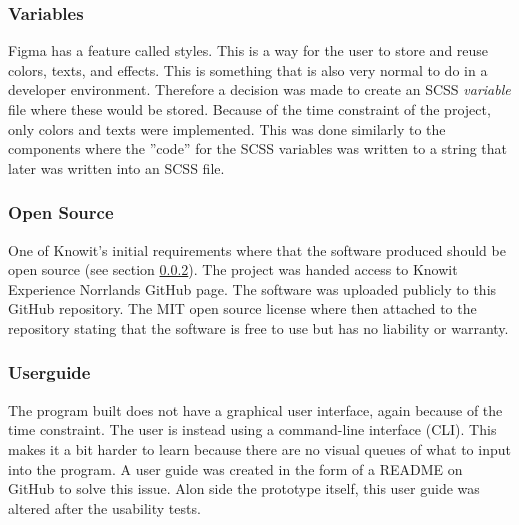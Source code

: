 \subsubsection{Variables}%
\label{ssub:Variables}
Figma has a feature called styles. This is a way for the user to store and reuse colors, texts, and effects. This is something that is also very normal to do in a developer environment. Therefore a decision was made to create an SCSS \textit{variable} file where these would be stored. Because of the time constraint of the project, only colors and texts were implemented. This was done similarly to the components where the ''code'' for the SCSS variables was written to a string that later was written into an SCSS file. 


\subsubsection{Open Source}%
\label{ssub:Open Source}
One of Knowit's initial requirements where that the software produced should be open source (see section \ref{ssub:Open Source}). The project was handed access to Knowit Experience Norrlands GitHub page. The software was uploaded publicly to this GitHub repository. The MIT\cite{MITLicenseOpen} open source license where then attached to the repository stating that the software is free to use but has no liability or warranty.
 
\subsubsection{Userguide}%
\label{ssub:Userguide}
The program built does not have a graphical user interface, again because of the time constraint. The user is instead using a command-line interface (CLI). This makes it a bit harder to learn because there are no visual queues of what to input into the program.  A user guide was created in the form of a README on GitHub\cite{BuildSoftwareBetter} to solve this issue. Alon side the prototype itself, this user guide was altered after the usability tests.




